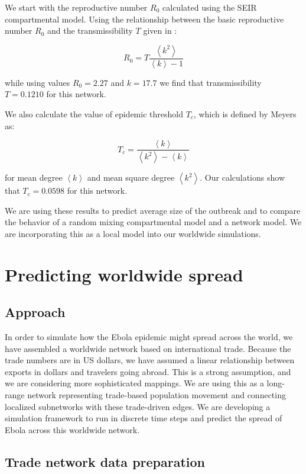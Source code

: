 \documentclass[10pt, journal,onecolumn]{IEEEtran}
\begin{document}
We start with the reproductive number $R_0$ calculated using the SEIR compartmental model.
Using the relationship between the basic reproductive number
$R_0$ and the transmissibility $T$ given in \cite{meyers2005network}:

\[
R_0 = T  \dfrac{\left\langle k^2 \right\rangle}{\left\langle k \right\rangle-1}
\]

while using values $R_0=2.27$ and $k=17.7$ we find that transmissibility $T=0.1210$ for this network.

We also calculate the value of epidemic threshold $T_c$, which is defined by Meyers as:

\[
T_c =\dfrac{\left\langle k \right\rangle}{\left\langle k^2 \right\rangle - \left\langle k \right\rangle}
\]

for mean degree $\left\langle k \right\rangle$ and mean square degree
$\left\langle k^2 \right\rangle$. Our calculations show that $T_c=0.0598$ for this network.

We are using these results to predict average size of the outbreak and to compare the behavior of
a random mixing compartmental model and a network model.
We are incorporating this as a local model into our worldwide simulations.






\section{Predicting worldwide spread}
\label{sec:Worldwide}

\subsection*{\textbf{Approach}}
In order to simulate how the Ebola epidemic might spread across the world, we have assembled a
worldwide network based on international trade. Because the trade numbers are in US dollars,
we have assumed a linear relationship between exports in dollars and travelers going abroad.
This is a strong assumption, and we are considering more sophisticated mappings.
We are using this as a long-range network representing trade-based population movement and
connecting localized subnetworks with these trade-driven edges. We are developing a simulation
framework to run in discrete time steps and predict the spread of Ebola across this worldwide network.

\subsection*{\textbf{Trade network data preparation}}
\end{document}
